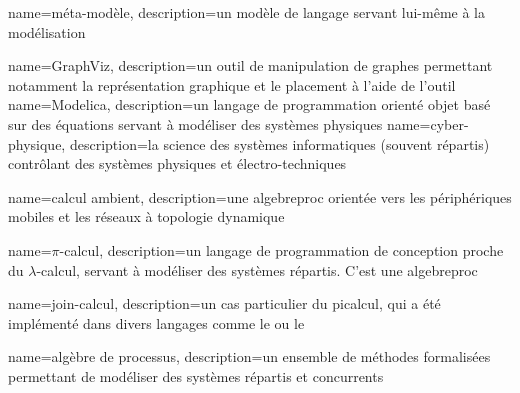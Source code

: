 {
	name={méta-modèle},
	description={un modèle de langage servant lui-même à la modélisation}	
}

{
	name=GraphViz, 
	description={un outil de manipulation de graphes permettant notamment la représentation graphique et le placement à l'aide de l'outil }
}
{
	name=Modelica, 
	description={un langage de programmation orienté objet basé sur des équations servant à modéliser des systèmes physiques}
}
{
	name=cyber-physique, 
	description={la science des systèmes informatiques (souvent répartis) contrôlant des systèmes physiques et électro-techniques}
}

{
	name={calcul ambient}, 
	description={une \gls{algebreproc} orientée vers les périphériques mobiles et les réseaux à topologie dynamique}
}

{
	name={$\pi$-calcul},
	description={un langage de programmation de conception proche du $\lambda$-calcul, servant à modéliser des systèmes répartis. C'est une \gls{algebreproc}}	
}

{
	name={join-calcul}, 
	description={un cas particulier du \gls{picalcul}, qui a été implémenté dans divers langages comme le  ou le }
}

{
	name={algèbre de processus},
	description={un ensemble de méthodes formalisées permettant de modéliser des systèmes répartis et concurrents}
}

